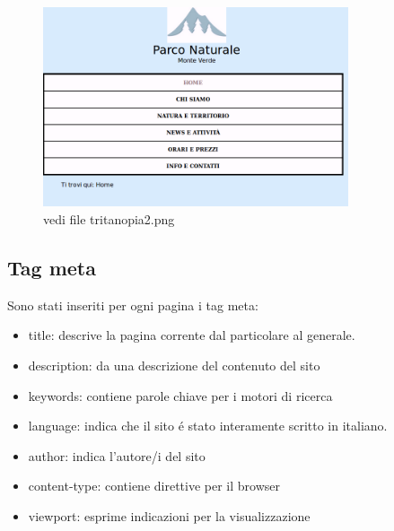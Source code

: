 \documentclass[12pt]{article}
\begin{document}
\begin{itemize}
			\begin{figure}
			\centering
			\includegraphics[width=90mm]{tritanopia2}
			\caption{vedi file tritanopia2.png}
			\end{figure}
			\end{itemize}	

			
			\newpage
			\subsection{Tag meta}
			
	 Sono stati inseriti per ogni pagina i tag meta:
	 		\begin{itemize}
				\item title: descrive la pagina corrente dal particolare al generale.
				\item description: da una descrizione del contenuto del sito
				\item keywords: contiene parole chiave per i motori di ricerca
				\item language: indica che il sito \'e stato interamente scritto in italiano.
				\item author: indica l'autore/i del sito
				\item content-type: contiene direttive per il browser
				\item viewport: esprime indicazioni per la visualizzazione
			\end{itemize}
\end{document}
